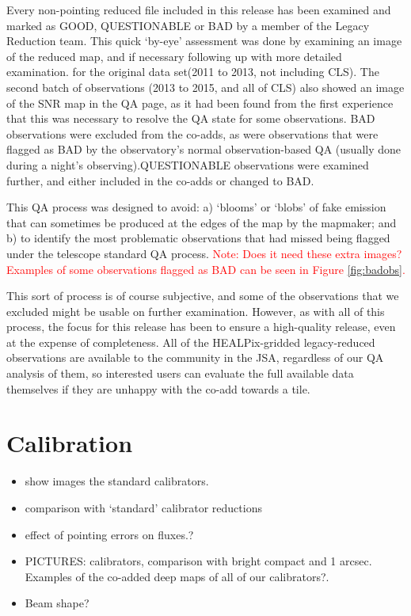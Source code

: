 \documentclass[twocolumn,times]{aastex6}
\newcommand{\note}[1]{\textcolor{red}{Note: #1}}
\newcommand{\status}[1]{\textsf{#1}}
\begin{document}
Every non-pointing reduced file included in this release has been
examined and marked as \status{GOOD}, \status{QUESTIONABLE} or
\status{BAD} by a member of the Legacy Reduction team. This quick
`by-eye' assessment was done by examining an image of the reduced map,
and if necessary following up with more detailed examination. for the
original data set(2011 to 2013, not including CLS). The second batch
of observations (2013 to 2015, and all of CLS) also showed an image of
the SNR map in the QA page, as it had been found from the first
experience that this was necessary to resolve the QA state for some
observations. \status{BAD} observations were excluded from the co-adds,
as were observations that were flagged as \status{BAD} by the
observatory's normal observation-based QA (usually done during a
night's observing).\status{QUESTIONABLE} observations were examined
further, and either included in the co-adds or changed to \status{BAD}.


This QA process was designed to avoid: a) `blooms' or `blobs' of fake
emission that can sometimes be produced at the edges of the map by the
mapmaker; and b) to identify the most problematic observations that
had missed being flagged under the telescope standard QA
process. \note{Does it need these extra images? Examples of some
  observations flagged as BAD can be seen in Figure \ref{fig:badobs}.}

This sort of process is of course subjective, and some of the
observations that we excluded might be usable on further
examination. However, as with all of this process, the focus for this
release has been to ensure a high-quality release, even at the expense
of completeness. All of the HEALPix-gridded legacy-reduced
observations are available to the community in the JSA, regardless of
our QA analysis of them, so interested users can evaluate the full
available data themselves if they are unhappy with the co-add towards a
tile.


\section{Calibration}
\label{sec:calib}


\begin{itemize}
\item show images the standard calibrators.
\item comparison with `standard' calibrator reductions
\item effect of pointing errors on fluxes.?
\item PICTURES: calibrators, comparison with bright compact and 1
  arcsec. Examples of the co-added deep maps of all of our
  calibrators?.
\item Beam shape?
\end{itemize}
\end{document}
